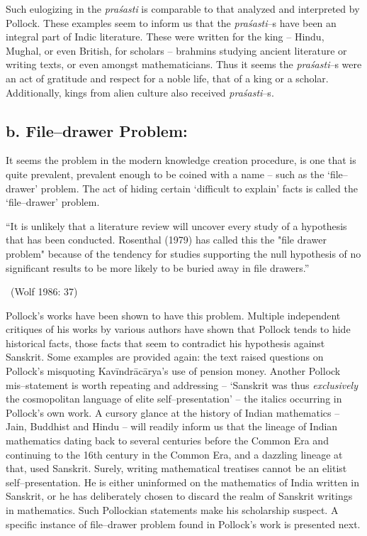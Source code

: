 Such eulogizing in the \textit{praśasti} is comparable to that analyzed and interpreted by Pollock. These examples seem to inform us that the \textit{praśasti}–s have been an integral part of Indic literature. These were written for the king – Hindu, Mughal, or even British, for scholars – brahmins studying ancient literature or writing texts, or even amongst mathematicians. Thus it seems the \textit{praśasti}–s were an act of gratitude and respect for a noble life, that of a king or a scholar. Additionally, kings from alien culture also received \textit{praśasti}–s.


\subsection*{b. File–drawer Problem:}

It seems the problem in the modern knowledge creation procedure, is one that is quite prevalent, prevalent enough to be coined with a name – such as the ‘file–drawer’ problem. The act of hiding certain ‘difficult to explain’ facts is called the ‘file–drawer’ problem.

\begin{myquote}
“It is unlikely that a literature review will uncover every study of a hypothesis that has been conducted. Rosenthal (1979) has called this the "file drawer problem" because of the tendency for studies supporting the null hypothesis of no significant results to be more likely to be buried away in file drawers.” 

~\hfill (Wolf 1986: 37)
\end{myquote}

Pollock’s works have been shown to have this problem. Multiple independent critiques of his works by various authors have shown that Pollock tends to hide historical facts, those facts that seem to contradict his hypothesis against Sanskrit. Some examples are provided again: the text raised questions on Pollock’s misquoting Kavīndrācārya’s use of pension money. Another Pollock mis–statement is worth repeating and addressing – ‘Sanskrit was thus \textit{exclusively} the cosmopolitan language of elite self–presentation’ – the italics occurring in Pollock’s own work. A cursory glance at the history of Indian mathematics – Jain, Buddhist and Hindu – will readily inform us that the lineage of Indian mathematics dating back to several centuries before the Common Era and continuing to the 16th century in the Common Era, and a dazzling lineage at that, used Sanskrit. Surely, writing mathematical treatises cannot be an elitist self–presentation. He is either uninformed on the mathematics of India written in Sanskrit, or he has deliberately chosen to discard the realm of Sanskrit writings in mathematics. Such Pollockian statements make his scholarship suspect. A specific instance of file–drawer problem found in Pollock’s work is presented next.

